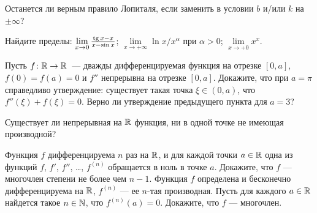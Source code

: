 \documentclass[a4paper, 12pt]{article}
\newcommand{\0}[1]{\overline{#1}}
\begin{document}
Останется ли верным правило Лопиталя, если заменить в условии $b$ и/или
$k$ на $\pm\infty$?



 Найдите пределы:
$\lim\limits_{x\rightarrow0} \frac{\tg x-x}{x-\sin x}$;
$\lim\limits_{x\rightarrow+\infty}\ln x/x^\alpha$ при $\alpha>0$;
 $\lim\limits_{x\rightarrow+0} x^x$.



 Пусть $f\colon\mathbb{R}\rightarrow\mathbb{R}$~--- дважды дифференцируемая функция
на отрезке $[0,a]$,  $f(0)=f(a)=0$ и $f''$
непрерывна на отрезке $[0,a]$.%
Докажите, что при
$a=\pi$ справедливо утверждение:  существует такая точка
$\xi\in(0,a)$, что $f''(\xi)+f(\xi)=0$.
Верно ли утверждение предыдущего пункта для $a=3$?





Существует ли непрерывная на $\mathbb{R}$ функция, ни в одной точке не имеющая производной?

 Функция $f$ дифференцируема $n$ раз на $\mathbb{R}$,
и для каждой точки $a\in\mathbb{R}$ одна из функций $f$, $f'$, $f''$,
\ldots, $f^{(n)}$ обращается в ноль в точке $a$.
Докажите, что $f$ --- многочлен степени не более чем $n-1$.
Функция $f$ определена и бесконечно дифференцируема на $\mathbb{R}$,
$f^{(n)}$ --- ее $n$-тая производная.
Пусть для каждого $a\in\mathbb{R}$ найдется такое $n\in\mathbb{N}$, что
$f^{(n)}(a)=0$. Докажите, что $f$ --- многочлен.



\end{document}
